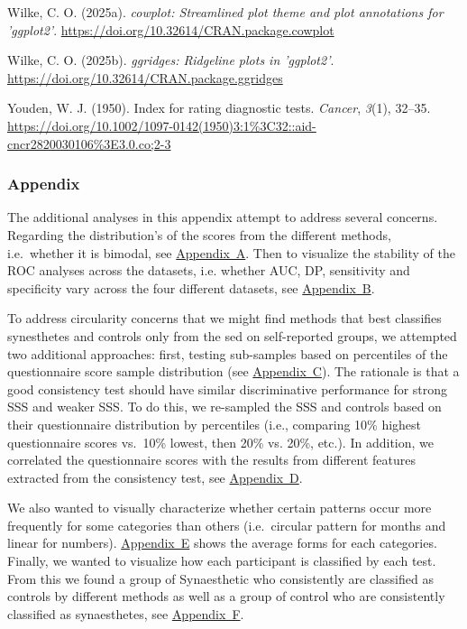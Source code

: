 \documentclass[
  man,
  longtable,
  a4paper,
  nolmodern,
  notxfonts,
  notimes,
  colorlinks=true,linkcolor=blue,citecolor=blue,urlcolor=blue]{apa7}
\newlength{\cslhangindent}
\newenvironment{CSLReferences}[2] %
 {\begin{list}{}{%
  \setlength{\itemindent}{0pt}
  \setlength{\leftmargin}{0pt}
  \setlength{\parsep}{0pt}
  \ifodd #1
   \setlength{\leftmargin}{\cslhangindent}
   \setlength{\itemindent}{-1\cslhangindent}
  \fi
  \setlength{\itemsep}{#2\baselineskip}}}
 {\end{list}}
\begin{document}
\begin{CSLReferences}{1}{0}
Wilke, C. O. (2025a). \emph{{cowplot}: Streamlined plot theme and plot
annotations for 'ggplot2'}.
\url{https://doi.org/10.32614/CRAN.package.cowplot}

Wilke, C. O. (2025b). \emph{{ggridges}: Ridgeline plots in 'ggplot2'}.
\url{https://doi.org/10.32614/CRAN.package.ggridges}

Youden, W. J. (1950). Index for rating diagnostic tests. \emph{Cancer},
\emph{3}(1), 32--35.
\url{https://doi.org/10.1002/1097-0142(1950)3:1\%3C32::aid-cncr2820030106\%3E3.0.co;2-3}

\end{CSLReferences}

\newpage{}

\subsubsection{Appendix}\label{appendix}

The additional analyses in this appendix attempt to address several
concerns. Regarding the distribution's of the scores from the different
methods, i.e.~whether it is bimodal, see
\hyperref[apx-featDensity]{Appendix~A}. Then to visualize the stability
of the ROC analyses across the datasets, i.e. whether AUC, DP,
sensitivity and specificity vary across the four different datasets, see
\hyperref[apx-SM2byds]{Appendix~B}.

To address circularity concerns that we might find methods that best
classifies synesthetes and controls only from the sed on self-reported
groups, we attempted two additional approaches: first, testing
sub-samples based on percentiles of the questionnaire score sample
distribution (see \hyperref[apx-byquestperc]{Appendix~C}). The rationale
is that a good consistency test should have similar discriminative
performance for strong SSS and weaker SSS. To do this, we re-sampled the
SSS and controls based on their questionnaire distribution by
percentiles (i.e., comparing 10\% highest questionnaire scores vs.~10\%
lowest, then 20\% vs. 20\%, etc.). In addition, we correlated the
questionnaire scores with the results from different features extracted
from the consistency test, see
\hyperref[apx-correlation-with-self-report]{Appendix~D}.

We also wanted to visually characterize whether certain patterns occur
more frequently for some categories than others (i.e.~circular pattern
for months and linear for numbers).
\hyperref[apx-average-forms]{Appendix~E} shows the average forms for
each categories. Finally, we wanted to visualize how each participant is
classified by each test. From this we found a group of Synaesthetic who
consistently are classified as controls by different methods as well as
a group of control who are consistently classified as synaesthetes, see
\hyperref[apx-alluvial]{Appendix~F}.
\end{document}
